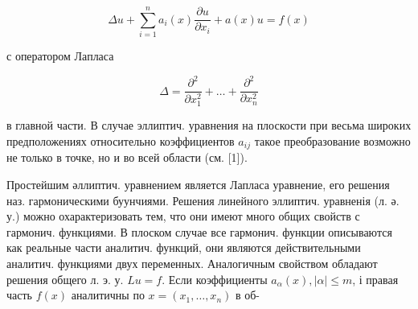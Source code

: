 \documentclass[10pt]{article}
\begin{document}
\[

\Delta u+\sum_{i=1}^{n} a_{i}(x) \frac{\partial u}{\partial x_{i}}+a(x) u=f(x)

\]



с оператором Лапласа



\[

\Delta=\frac{\partial^{2}}{\partial x_{1}^{2}}+\ldots+\frac{\partial^{2}}{\partial x_{n}^{2}}

\]



в главной части. В случае эллиптич. уравнения на плоскости при весьма широких предположениях относительно коэффициентов $a_{i j}$ такое преобразование возможно не только в точке, но и во всей области (см. [1]).



Простейшим әллиптич. уравнением является Лапласа уравнение, его решения наз. гармоническими буунчиями. Решения линейного эллиптич. уравненія (л. ә. у.) можно охарактеризовать тем, что они имеют много общих свойств с гармонич. функциями. В плоском случае все гармонич. функции описываются как реальные части аналитич. функций, они являются действительными аналитич. функциями двух переменных. Аналогичным свойством обладают решения общего л. э. у. $L u=f$. Если коэффициенты $a_{\alpha}(x),|\alpha| \leqslant m$, і правая часть $f(x)$ аналитичны по $x=\left(x_{1}, \ldots, x_{n}\right)$ в об-
\end{document}
